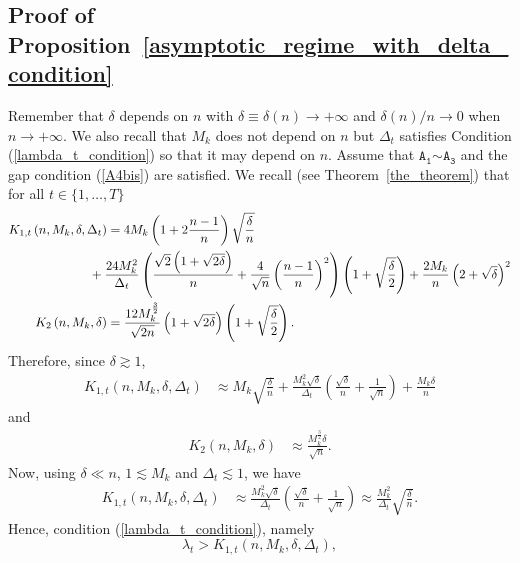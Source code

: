 \documentclass[twoside,11pt]{article}
\newcommand{\nb}{n}
\newcommand{\A}[1]{$\mathtt{A_#1}$}
\begin{document}
 \subsection{Proof of Proposition~\ref{asymptotic_regime_with_delta_condition}}\label{sec:proofProp1}
Remember that $\delta$ depends on $n$ with $\delta\equiv \delta(n)\to+\infty$ and $\delta(n)/n\to 0$ when $n\to+\infty$. We also recall that $M_k$ does not depend on $n$ but $\Delta_t$ satisfies Condition (\ref{lambda_t_condition}) so that it may depend on $n$.
Assume that \A{1}$\sim$\A{3} and the gap condition (\ref{A4bis}) are satisfied. We recall (see Theorem~\ref{the_theorem}) that for all $t \in \{1,\ldots,T\}$
    \begin{align*}
        K_{1,t}\left(\nb,M_k,\delta,\Delta_t \right) 
         &= 4 M_k \left(1+ 2 \frac{\nb-1}{\nb} \right) \sqrt{\frac{\delta}{\nb}} \ \notag \\
        & \hspace{-0.5 cm} + \frac{24 M_k^2}{\Delta_t} \left(\frac{\sqrt{2} \left(1 +\sqrt{2\delta} \right)}{\nb } +  \frac{4}{\sqrt{\nb}} \left(\frac{\nb-1}{\nb}\right)^2 \right) \left( 1+ \sqrt{\frac{\delta}{2}} \right)  + \frac{2 M_k}{\nb} \left(2 + \sqrt{\delta} \right)^2  \notag \\
         K_2 \left( \nb,M_k,\delta \right)  &= \frac{12 M_k^{\frac{3}{2}}}{\sqrt{2 \nb}} \left(1 + \sqrt{2\delta}\right) \left(1 + \sqrt{\frac{\delta}{2}} \right).
    \end{align*}
Therefore, since $\delta\gtrsim 1$,
\begin{align*}
K_{1,t}\left(\nb,M_k,\delta,\Delta_t \right) 
         &\approx M_k\sqrt{\frac{\delta}{\nb}} + \frac{M_k^2\sqrt{\delta}}{\Delta_t} \left(\frac{\sqrt{\delta}}{\nb } +  \frac{1}{\sqrt{\nb}}  \right)  + \frac{M_k\delta}{\nb}
\end{align*}
and
\begin{align}\label{K2}
K_2 \left( \nb,M_k,\delta \right)  &\approx  \frac{M_k^{\frac{3}{2}}\delta}{\sqrt{n}}.
\end{align}
Now, using $\delta\ll n$, $1\lesssim M_k$ and $\Delta_t\lesssim 1$, we have
\begin{align}\label{K1}
K_{1,t}\left(\nb,M_k,\delta,\Delta_t \right) 
         &\approx \frac{M_k^2\sqrt{\delta}}{\Delta_t} \left(\frac{\sqrt{\delta}}{\nb } +  \frac{1}{\sqrt{\nb}}  \right)\approx  \frac{M_k^2}{\Delta_t} \sqrt{\frac{\delta}{\nb}}.
\end{align}
Hence, condition (\ref{lambda_t_condition}), namely
$$ \lambda_t > K_{1,t}\left(\nb,M_k,\delta,\Delta_t \right),$$
\end{document}
